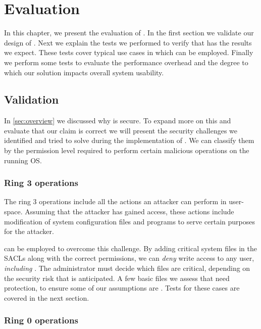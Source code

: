 \acresetall
\chapter{Evaluation}\label{ch:chapter4}

In this chapter, we present the evaluation of . In the first section we validate our design of . Next we explain the tests we performed to verify that  has the results we expect. These tests cover typical use cases in which  can be employed. Finally we perform some tests to evaluate the performance overhead and the degree to which our solution impacts overall system usability.

\section{Validation}\label{sec:validation}

\par In \ref{sec:overview} we discussed why  is secure. To expand more on this and evaluate that our claim is correct we will present the security challenges we identified and tried to solve during the implementation of . We can classify them by the permission level required to perform certain malicious operations on the running \ac{OS}. 

\subsection{Ring 3 operations}

\par The ring 3 operations include all the actions an attacker can perform in user-space. Assuming that the attacker has gained  access, these actions include modification of system configuration files and programs to serve certain purposes for the attacker. 
\par {} can be employed to overcome this challenge. By adding critical system files in the \acp{SACL} along with the correct permissions, we can \emph{deny} write access to any user, \emph{including} . The administrator must decide which files are critical, depending on the security risk that is anticipated. A few basic files we assess that need protection, to ensure some of our assumptions are . Tests for these cases are covered in the next section.

\subsection{Ring 0 operations}\label{sub:ring0}

